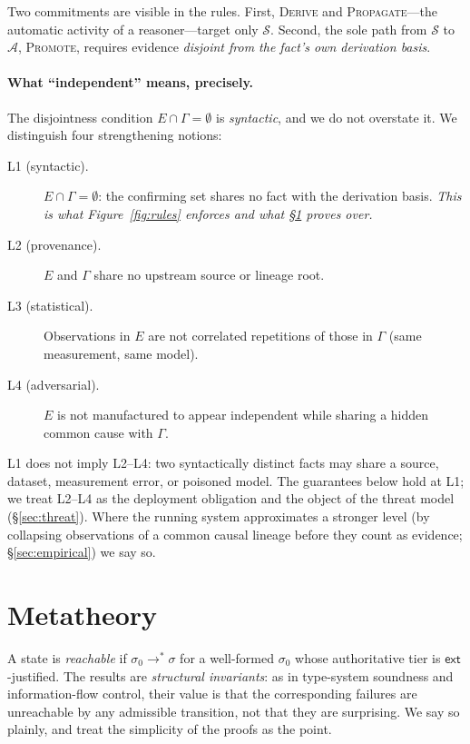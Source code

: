 \documentclass[11pt]{article}
\theoremstyle{plain}
\theoremstyle{definition}
\newcommand{\Aut}{\mathcal{A}}
\newcommand{\Soft}{\mathcal{S}}
\newcommand{\St}{\sigma}
\newcommand{\ext}{\mathsf{ext}}
\newcommand{\reduces}{\longrightarrow}
\begin{document}
Two commitments are visible in the rules. First, \textsc{Derive} and
\textsc{Propagate}---the automatic activity of a reasoner---target only $\Soft$.
Second, the sole path from $\Soft$ to $\Aut$, \textsc{Promote}, requires evidence
\emph{disjoint from the fact's own derivation basis}.

\paragraph{What ``independent'' means, precisely.} The disjointness condition
$E\cap\Gamma=\emptyset$ is \emph{syntactic}, and we do not overstate it. We
distinguish four strengthening notions:
\begin{description}
\item[L1 (syntactic).] $E\cap\Gamma=\emptyset$: the confirming set shares no fact
with the derivation basis. \emph{This is what Figure~\ref{fig:rules} enforces and
what \S\ref{sec:meta} proves over.}
\item[L2 (provenance).] $E$ and $\Gamma$ share no upstream source or lineage root.
\item[L3 (statistical).] Observations in $E$ are not correlated repetitions of
those in $\Gamma$ (same measurement, same model).
\item[L4 (adversarial).] $E$ is not manufactured to appear independent while
sharing a hidden common cause with $\Gamma$.
\end{description}
L1 does not imply L2--L4: two syntactically distinct facts may share a source,
dataset, measurement error, or poisoned model. The guarantees below hold at L1;
we treat L2--L4 as the deployment obligation and the object of the threat model
(\S\ref{sec:threat}). Where the running system approximates a stronger level (by
collapsing observations of a common causal lineage before they count as evidence;
\S\ref{sec:empirical}) we say so.

\section{Metatheory}
\label{sec:meta}

A state is \emph{reachable} if $\St_0 \reduces^{*} \St$ for a well-formed $\St_0$
whose authoritative tier is $\ext$-justified. The results are \emph{structural
invariants}: as in type-system soundness and information-flow control, their value
is that the corresponding failures are unreachable by any admissible transition,
not that they are surprising. We say so plainly, and treat the simplicity of the
proofs as the point.
\end{document}

